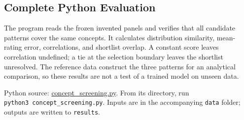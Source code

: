 \hypertarget{M04-complete-python-evaluation}{%
\subsection{Complete Python
Evaluation}\label{M04-complete-python-evaluation}}

\noindent \noindent The program reads the frozen invented panels and verifies that
all candidate patterns cover the same concepts. It calculates
distribution similarity, mean-rating error, correlations, and shortlist
overlap. A constant score leaves correlation undefined; a tie at the
selection boundary leaves the shortlist unresolved. The reference data
construct the three patterns for an analytical comparison, so these
results are not a test of a trained model on unseen data.

\FloatBarrier
{}
Python source:
\href{../03_Data_and_Code/Synthetic_Consumers/concept_screening.py}{concept\_screening.py}.
From its directory, run \texttt{python3\ concept\_screening.py}. Inputs
are in the accompanying \texttt{data} folder; outputs are written to
\texttt{results}.

